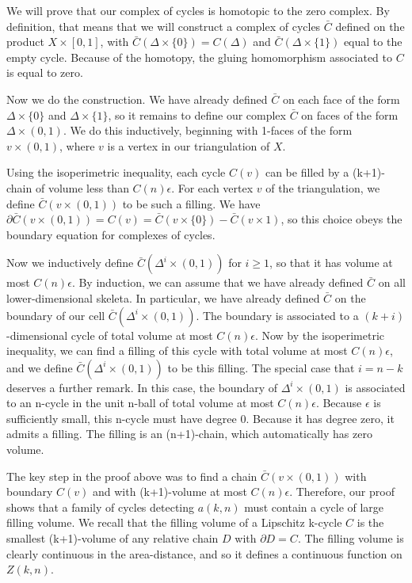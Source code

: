 \documentclass{amsart}
\newtheorem*{Theorem 1}{Theorem 1}
\newtheorem*{Theorem 2}{Theorem 2}
\newtheorem*{Theorem 1A}{Theorem 1A}
\newtheorem*{Theorem 2A}{Theorem 2A}
\newtheorem*{vanishing lemma}{Vanishing Lemma}
\numberwithin{equation}{section}
\begin{document}
We will prove that our complex of cycles is homotopic to the zero
complex.  By definition, that means that we will construct a
complex of cycles $\bar C$ defined on the product $X \times
[0,1]$, with $\bar C(\Delta \times \{ 0 \}) = C(\Delta)$ and
$\bar C(\Delta \times \{ 1 \})$ equal to the empty cycle. 
Because of the homotopy, the gluing homomorphism associated to
$C$ is equal to zero.

Now we do the construction.  We have already defined $\bar C$ on
each face of the form $\Delta \times \{ 0 \}$ and $\Delta \times
\{ 1 \}$, so it remains to define our complex $\bar C$ on faces
of the form $\Delta \times (0,1)$.  We do this inductively,
beginning with 1-faces of the form $v \times (0,1)$, where $v$ is
a vertex in our triangulation of $X$.

Using the isoperimetric inequality, each cycle $C(v)$ can be
filled by a (k+1)-chain of volume less than $C(n)
\epsilon$.  For each vertex $v$ of the triangulation, we define
$\bar C(v \times (0,1))$ to be such a filling.  We have $\partial
\bar C(v \times (0,1)) = C(v) = \bar C(v \times \{0 \}) - \bar
C(v \times 1)$, so this choice obeys the boundary equation for
complexes of cycles.

Now we inductively define $\bar C(\Delta^i \times (0,1))$ for $i
\ge 1$, so that it has volume at most $C(n) \epsilon$.  By
induction, we can assume that we have already defined $\bar C$ on
all lower-dimensional skeleta.  In particular, we have already
defined $\bar C$ on the boundary of our cell $\bar C(\Delta^i
\times (0,1))$.  The boundary is associated to a
$(k+i)$-dimensional cycle of total volume at most $C(n)
\epsilon$.  Now by the isoperimetric inequality, we can find a
filling of this cycle with total volume at most $C(n) \epsilon$,
and we define $\bar C(\Delta^i \times (0,1))$ to be this filling.  
The special case that $i = n-k$
deserves a further remark.  In this case, the boundary of
$\Delta^i \times (0,1)$ is associated to an n-cycle in the unit
n-ball of total volume at most $C(n) \epsilon$.  Because
$\epsilon$ is sufficiently small, this n-cycle must have degree
0.  Because it has degree zero, it admits a filling.  The filling
is an (n+1)-chain, which automatically has zero volume. \endproof

The key step in the proof above was to find a chain $\bar C(v
\times (0,1))$ with boundary $C(v)$ and with (k+1)-volume at most
$C(n) \epsilon$.  Therefore, our proof shows that a family of
cycles detecting $a(k,n)$ must contain a cycle of large filling
volume.  We recall that the filling volume of a Lipschitz k-cycle
$C$ is the smallest (k+1)-volume of any relative chain $D$ with
$\partial D = C$.  The filling volume is clearly continuous in
the area-distance, and so it defines a continuous function on $Z(k,n)$.
\end{document}
